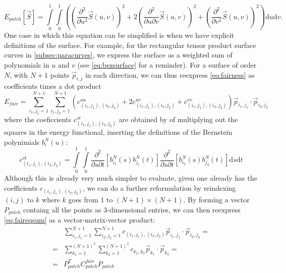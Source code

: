 \begin{equation}
\label{eq:fairness}
E_{patch}\left[\vec{S}\right] = 
\int\limits_0^1 \int\limits_0^1
\left(
\left(
\frac{\partial^2}{\partial u^2 }\vec{S}(u,v)
\right)^2
+ 2 
\left(
\frac{\partial^2}{\partial u\partial v} \vec{S}(u,v)
\right)^2
+
\left(
\frac{\partial^2}{\partial v^2}\vec{S}(u,v)
\right)^2
\right)
\text{d}u\text{d}v.
\end{equation}
One case in which this equation can be simplified is when we have explicit definitions of the surface. For example, for the rectangular \Bez tensor product surface curves in \autoref{subsec:paracurves}, we express the surface as a weighted sum of polynomials in $u$ and $v$ (see \autoref{eq:bezsurface} for a reminder). For a \Bez surface of order $N$, with $N+1$ points $\vec{p}_{i,j}$ in each direction, we can thus reexpress \autoref{eq:fairness} as coefficients times a dot product 
\begin{equation}
\label{eq:faireqsum}
E_{fair} =  \sum\limits_{i_1,j_1=1}^{N+1} \sum\limits_{i_2,j_2=1}^{N+1} \left( c_{(i_1,j_1),(i_2,j_2)}^{uu} + 2c_{(i_1,j_1),(i_2,j_2)}^{uv} + c_{(i_1,j_1),(i_2,j_2)}^{vv} \right) \vec{p}_{i_1,j_1} \cdot\vec{p}_{i_2 ,j_2} 
\end{equation} 
where the coeficcients $c_{(i_1,j_1),(i_2,j_2)}^{st}$ are obtained by of multiplying out the squares in the energy functional, inserting the definitions of the Bernstein polynimials $b_{i}^N(u)$:
\begin{equation}
c_{(i_1,j_1),(i_2,j_2)}^{st} = 
\int\limits_0^1 \int\limits_0^1 \frac{\partial^2}{\partial s \partial t} \left[b_{i_1}^N(s) b_{j_1}^N(t)\right]\frac{\partial^2}{\partial s \partial t} \left[ b_{i_2}^N(s) b_{j_2}^N(t)\right]
\text{d}s\text{d}t
\end{equation}
Although this is already very much simpler to evaluate, given one already has the coefficients $c_{(i_1,j_1),(i_2,j_2)}$, we can do a further reformulation by reindexing $(i,j)$ to $k$ where $k$ goes from $1$ to $(N+1)\times(N+1)$. By forming a vector $P_{patch}$ containg all the points as 3-dimensional entries, we can then reexpress \autoref{eq:faireqsum} as a vector-matrix-vector product:
\begin{align*}
\phantom{=}& \sum\limits_{i_1,j_1=1}^{N+1} \sum\limits_{i_2,j_2=1}^{N+1} c_{(i_1,j_1),(i_2,j_2)} \vec{p}_{i_1,j_1} \cdot\vec{p}_{i_2 ,j_2} =
\\
=& \sum\limits_{k_1=1}^{(N+1)^2} \sum\limits_{k_2=1}^{(N+1)^2} c_{k_1,k_2} \vec{p}_{k_1} \cdot\vec{p}_{k_2} =
\\
=& P_{patch}^T C_{patch}^{fair} P_{patch}
\end{align*}

